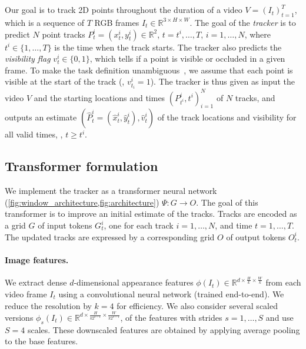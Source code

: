 \section{\method}%
\label{sec:method}

Our goal is to track 2D points throughout the duration of a video $V = (I_t)_{t=1}^T$, which is a sequence of $T$ RGB frames $I_t \in \mathbb{R}^{3 \times H \times W}$.
The goal of the \emph{tracker} is to predict $N$ point tracks
$
P^i_t = (x^i_t, y^i_t) \in \mathbb{R}^{2}
$,
$
t =t^i,\dots,T
$,
$
i=1,\dots,N
$,
where
$
t^i \in \{1, \dots, T\}
$
is the time when the track starts.
The tracker also predicts the \emph{visibility flag} $v^i_t \in \{0,1\}$, which tells if a point is visible or occluded in a given frame.
To make the task definition unambiguous~\cite{tapvid}, we assume that each point is visible at the start of the track (\ie, $v^i_{t_i} = 1$).
The tracker is thus given as input the video $V$ and the starting locations and times $(P^i_{t^i}, t^i)_{i=1}^N$ of $N$ tracks, and outputs an estimate
$
(\hat P^i_t = (\hat x^i_t, \hat y^i_t), \hat v^i_t)
$
of the track locations and visibility for all valid times, \ie, $t \ge t^i$.


\subsection{Transformer formulation}

We implement the tracker as a transformer neural network (\cref{fig:window_architecture,fig:architecture})
$
\Psi : G \to O
$.
The goal of this transformer is to improve an initial estimate of the tracks.
Tracks are encoded as a grid $G$ of input tokens $G^i_t$, one for each track $i=1,\dots,N$, and time $t=1,\dots, T$.
The updated tracks are expressed by a corresponding grid $O$ of output tokens $O^i_t$.

\paragraph{Image features.}

We extract dense $d$-dimensional appearance features
$
\phi(I_t) \in \mathbb{R}^{d\times \frac{H}{k} \times \frac{W}{k}}
$
from each video frame $I_t$ using a convolutional neural network (trained end-to-end).
We reduce the resolution by $k=4$ for efficiency.
We also consider several scaled versions
$
\phi_s(I_t)\in \mathbb{R}^{d\times \frac{H}{k2^{s-1}} \times \frac{W}{k2^{s-1}}}
$,
of the features with strides $s=1,\dots,S$ and use $S=4$ scales.
These downscaled features are obtained by applying average pooling to the base features.


